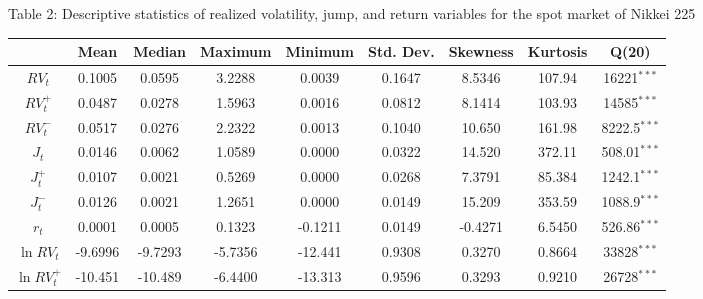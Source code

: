 \documentclass[10pt]{article}
\begin{document}
\newpage
\fontsize{11pt}{15pt}\selectfont
\begin{landscape}
\begin{center}
Table 2: Descriptive statistics of realized volatility, jump, and return variables for the spot market of Nikkei 225
\end{center}

\begin{center}
\begin{tabular}{ccccccccc} \hline       
                           &Mean          &Median     &Maximum     & Minimum    &Std. Dev.            &Skewness        &Kurtosis        & Q(20)           \\ \hline 
$RV_t$                  &0.1005         &0.0595     &3.2288         &0.0039       &0.1647               &8.5346            &107.94          & 16221$^{\ast \ast \ast}$              \\
$RV_t^{+}$              &0.0487         &0.0278     &1.5963         &0.0016       &0.0812               &8.1414            &103.93          & 14585$^{\ast \ast \ast}$              \\
$RV_t^{-}$              &0.0517         &0.0276     &2.2322         &0.0013       &0.1040               &10.650            &161.98          & 8222.5$^{\ast \ast \ast}$              \\
$J_t$                    &0.0146         &0.0062     &1.0589         &0.0000        &0.0322               &14.520            &372.11          & 508.01$^{\ast \ast \ast}$              \\
$J_t^{+}$               &0.0107         &0.0021     &0.5269        &0.0000        &0.0268               &7.3791            &85.384          & 1242.1$^{\ast \ast \ast}$              \\
$J_t^{-}$               &0.0126         &0.0021     &1.2651         &0.0000      &0.0149               &15.209              &353.59          & 1088.9$^{\ast \ast \ast}$             \\
$r_t$                     &0.0001         &0.0005     &0.1323         &-0.1211     &0.0149               &-0.4271            &6.5450          &526.86$^{\ast \ast \ast}$             \\
$\ln RV_t$             &-9.6996       &-9.7293    &-5.7356       &-12.441      &0.9308               &0.3270            &0.8664         &  33828$^{\ast \ast \ast}$               \\
$\ln RV_t^{+}$         &-10.451       &-10.489   &-6.4400        &-13.313     &0.9596              &0.3293            &0.9210          &   26728$^{\ast \ast \ast}$               \\

\end{tabular}
\end{center}
\end{landscape}
\end{document}
